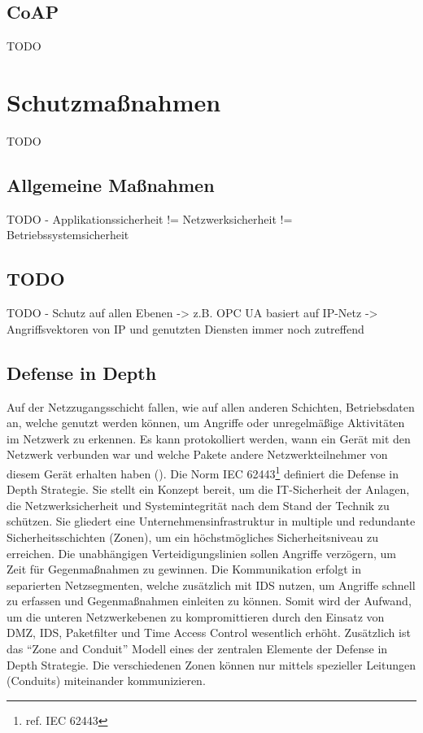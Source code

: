 \subsection{\ac{CoAP}}
TODO 

\section{Schutzmaßnahmen}
TODO 

\subsection{Allgemeine Maßnahmen}
TODO - Applikationssicherheit != Netzwerksicherheit != Betriebssystemsicherheit

\subsection{TODO}
TODO - Schutz auf allen Ebenen -> z.B. OPC UA basiert auf IP-Netz -> Angriffsvektoren von IP und genutzten Diensten immer noch zutreffend

\subsection{Defense in Depth}
Auf der Netzzugangsschicht fallen, wie auf allen anderen Schichten, Betriebsdaten an, welche genutzt werden können, um Angriffe oder unregelmäßige Aktivitäten im Netzwerk zu erkennen. Es kann protokolliert werden, wann ein Gerät mit den Netzwerk verbunden war und welche Pakete andere Netzwerkteilnehmer von diesem Gerät erhalten haben (\cite{sichKom2017}). Die Norm IEC 62443\footnote{ref. IEC 62443} definiert die Defense in Depth Strategie. Sie stellt ein Konzept bereit, um die IT-Sicherheit der Anlagen, die Netzwerksicherheit und Systemintegrität nach dem Stand der Technik zu schützen. Sie gliedert eine Unternehmensinfrastruktur in multiple und redundante Sicherheitsschichten (Zonen), um ein höchstmögliches Sicherheitsniveau zu erreichen. Die unabhängigen Verteidigungslinien sollen Angriffe verzögern, um Zeit für Gegenmaßnahmen zu gewinnen. Die Kommunikation erfolgt in separierten Netzsegmenten, welche zusätzlich mit \ac{IDS} nutzen, um Angriffe schnell zu erfassen und Gegenmaßnahmen einleiten zu können. Somit wird der Aufwand, um die unteren Netzwerkebenen zu kompromittieren durch den Einsatz von \ac{DMZ}, \ac{IDS}, Paketfilter und Time Access Control wesentlich erhöht. Zusätzlich ist das "`Zone and Conduit"' Modell eines der zentralen Elemente der Defense in Depth Strategie. Die verschiedenen Zonen können nur mittels spezieller Leitungen (Conduits) miteinander kommunizieren.  

